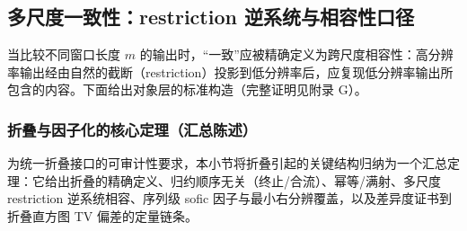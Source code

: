 \subsection{多尺度一致性：restriction 逆系统与相容性口径}\label{subsec:folding-multiscale}

当比较不同窗口长度 $m$ 的输出时，“一致”应被精确定义为跨尺度相容性：高分辨率输出经由自然的截断（restriction）投影到低分辨率后，应复现低分辨率输出所包含的内容。下面给出对象层的标准构造（完整证明见附录 G）。

\subsubsection{折叠与因子化的核心定理（汇总陈述）}\label{subsec:fold-theorem-suite}
为统一折叠接口的可审计性要求，本小节将折叠引起的关键结构归纳为一个汇总定理：它给出折叠的精确定义、归约顺序无关（终止/合流）、幂等/满射、多尺度 restriction 逆系统相容、序列级 sofic 因子与最小右分辨覆盖，以及差异度证书到折叠直方图 TV 偏差的定量链条。

